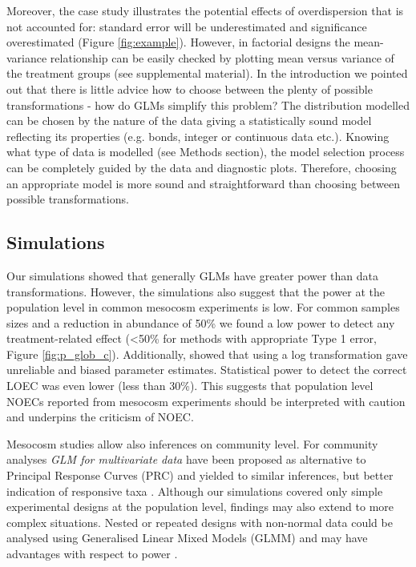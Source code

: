 \documentclass{scrartcl}
\begin{document}
Moreover, the case study illustrates the potential effects of overdispersion that is not accounted for: standard error will be underestimated and significance overestimated (Figure \ref{fig:example}).
However, in factorial designs the mean-variance relationship can be easily checked by plotting mean versus variance of the treatment groups (see supplemental material).
In the introduction we pointed out that there is little advice how to choose between the plenty of possible transformations - how do GLMs simplify this problem?
The distribution modelled can be chosen by the nature of the data giving a statistically sound model reflecting its properties (e.g. bonds, integer or continuous data etc.).
Knowing what type of data is modelled (see Methods section), the model selection process can be completely guided by the data and diagnostic plots. Therefore, choosing an appropriate model is more sound and straightforward than choosing between possible transformations.


\subsection{Simulations}
Our simulations showed that generally GLMs have greater power than data transformations.
However, the simulations also suggest that the power at the population level in common mesocosm experiments is low.
For common samples sizes and a reduction in abundance of 50\% we found a low power to detect any treatment-related effect (\textless 50\% for methods with appropriate Type 1 error, Figure \ref{fig:p_glob_c}).
Additionally, \citet{ohara_not_2010} showed that using a log transformation gave unreliable and biased parameter estimates.
Statistical power to detect the correct LOEC was even lower (less than 30\%).
This suggests that population level NOECs reported from mesocosm experiments should be interpreted with caution and underpins the criticism of NOEC.

Mesocosm studies allow also inferences on community level. 
For community analyses \emph{GLM for multivariate data} have been proposed as alternative to Principal Response Curves (PRC) and yielded to similar inferences, but better indication of responsive taxa \citep{warton_distance-based_2012,szocs_analysing_2015}. 
Although our simulations covered only simple experimental designs at the population level, findings may also extend to more complex situations. 
Nested or repeated designs with non-normal data could be analysed using Generalised Linear Mixed Models (GLMM) and may have advantages with respect to power \citep{stroup_rethinking_2014}.
\end{document}
